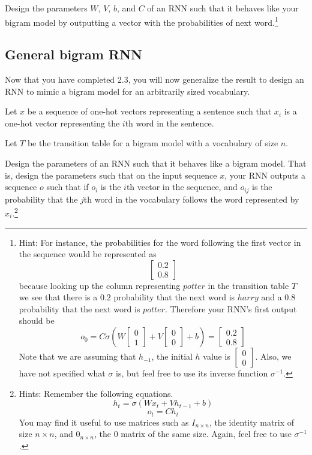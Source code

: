 \documentclass{article}
\begin{document}
Design the parameters $W$, $V$, $b$, and $C$ of an RNN such that it behaves like your bigram model by outputting a vector with the probabilities of next word.\footnote{Hint: For instance, the probabilities for the word following the first vector in the sequence would be represented as
$$ \begin{bmatrix} 0.2 \\ 0.8 \end{bmatrix} $$
because looking up the column representing $potter$ in the transition table $T$ we see that there is a $0.2$ probability that the next word is $harry$ and a 0.8 probability that the next word is $potter$. Therefore your RNN's first output should be
$$ o_0 = C\sigma\left(W\begin{bmatrix} 0 \\ 1 \end{bmatrix} + V\begin{bmatrix} 0 \\ 0 \end{bmatrix} + b\right) = \begin{bmatrix} 0.2 \\ 0.8 \end{bmatrix} $$
Note that we are assuming that $h_{-1}$, the initial $h$ value is $\begin{bmatrix} 0 \\ 0 \end{bmatrix}$. Also, we have not specified what $\sigma$ is, but feel free to use its inverse function $\sigma^{-1}$.}

\subsection{General bigram RNN}
Now that you have completed 2.3, you will now generalize the result to design an RNN to mimic a bigram model for an arbitrarily sized vocabulary.

Let $x$ be a sequence of one-hot vectors representing a sentence such that $x_i$ is a one-hot vector representing the $i$th word in the sentence.

Let $T$ be the transition table for a bigram model with a vocabulary of size $n$.

Design the parameters of an RNN such that it behaves like a bigram model. That is, design the parameters such that on the input sequence $x$, your RNN outputs a sequence $o$ such that if $o_i$ is the $i$th vector in the sequence, and $o_{ij}$ is the probability that the $j$th word in the vocabulary follows the word represented by $x_i$.\footnote{Hints: Remember the following equations.
$$ h_t = \sigma(Wx_t + Vh_{t - 1} + b) $$
$$ o_t = Ch_t $$
You may find it useful to use matrices such as $I_{n \times n}$, the identity matrix of size $n \times n$, and $0_{n \times n}$, the 0 matrix of the same size. Again, feel free to use $\sigma^{-1}$.}
\end{document}
